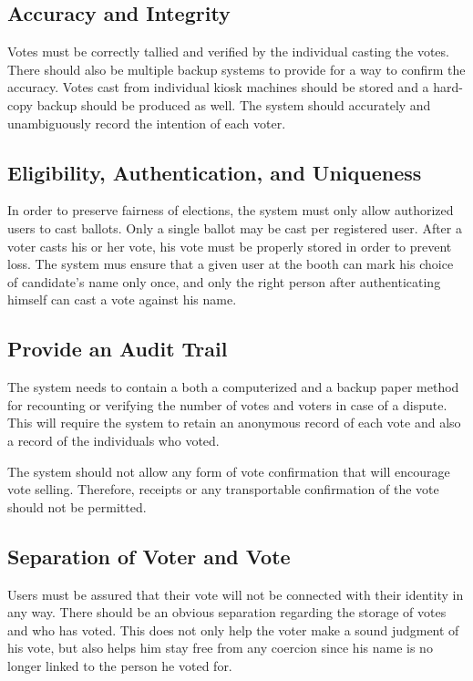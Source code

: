 \documentclass[a4paper,12pt]{extarticle}
\begin{document}
\subsection{Accuracy and Integrity}

Votes must be correctly tallied and verified by the individual casting the votes.  There should also be multiple backup systems to provide for a way to confirm the accuracy.  Votes cast from individual kiosk machines should be stored and a hard-copy backup should be produced as well. The system should accurately and unambiguously record the intention of each voter.


\subsection{Eligibility, Authentication, and Uniqueness}

 In order to preserve fairness of elections, the system must only allow authorized users to cast ballots.  Only a single ballot may be cast per registered user.  After a voter casts his or her vote, his vote must be properly stored in order to prevent loss. The system mus ensure that a given user at the booth can mark his choice of candidate's name only once, and only the right person after authenticating himself can cast a vote against his name.

\subsection{Provide an Audit Trail}
The system needs to contain a both a computerized and a backup paper method for recounting or verifying the number of votes and voters in case of a dispute.  This will require the system to retain an anonymous record of each vote and also a record of the individuals who voted.

The system should not allow any form of vote confirmation that will encourage vote selling. Therefore, receipts or any transportable confirmation of the vote should not be permitted.


\subsection{Separation of Voter and Vote }

Users must be assured that their vote will not be connected with their identity in any way.  There should be an obvious separation regarding the storage of votes and who has voted. This does not only help the voter make a sound judgment of his vote, but also helps him stay free from any coercion since his name is no longer linked to the person he voted for.
\end{document}
